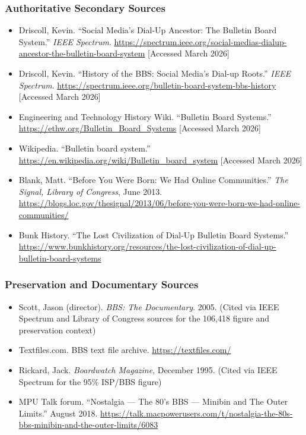 \documentclass[11pt,letterpaper]{article}
\begin{document}
\subsubsection{Authoritative Secondary Sources}

\begin{itemize}[leftmargin=1.5em]
  \item Driscoll, Kevin. ``Social Media's Dial-Up Ancestor: The Bulletin Board System.'' \textit{IEEE Spectrum}. \url{https://spectrum.ieee.org/social-medias-dialup-ancestor-the-bulletin-board-system} [Accessed March 2026]
  \item Driscoll, Kevin. ``History of the BBS: Social Media's Dial-up Roots.'' \textit{IEEE Spectrum}. \url{https://spectrum.ieee.org/bulletin-board-system-bbs-history} [Accessed March 2026]
  \item Engineering and Technology History Wiki. ``Bulletin Board Systems.'' \url{https://ethw.org/Bulletin_Board_Systems} [Accessed March 2026]
  \item Wikipedia. ``Bulletin board system.'' \url{https://en.wikipedia.org/wiki/Bulletin_board_system} [Accessed March 2026]
  \item Blank, Matt. ``Before You Were Born: We Had Online Communities.'' \textit{The Signal, Library of Congress}, June 2013. \url{https://blogs.loc.gov/thesignal/2013/06/before-you-were-born-we-had-online-communities/}
  \item Bunk History. ``The Lost Civilization of Dial-Up Bulletin Board Systems.'' \url{https://www.bunkhistory.org/resources/the-lost-civilization-of-dial-up-bulletin-board-systems}
\end{itemize}

\subsubsection{Preservation and Documentary Sources}

\begin{itemize}[leftmargin=1.5em]
  \item Scott, Jason (director). \textit{BBS: The Documentary}. 2005. (Cited via IEEE Spectrum and Library of Congress sources for the 106,418 figure and preservation context)
  \item Textfiles.com. BBS text file archive. \url{https://textfiles.com/}
  \item Rickard, Jack. \textit{Boardwatch Magazine}, December 1995. (Cited via IEEE Spectrum for the 95\% ISP/BBS figure)
  \item MPU Talk forum. ``Nostalgia --- The 80's BBS --- Minibin and The Outer Limits.'' August 2018. \url{https://talk.macpowerusers.com/t/nostalgia-the-80s-bbs-minibin-and-the-outer-limits/6083}
\end{itemize}
\end{document}
